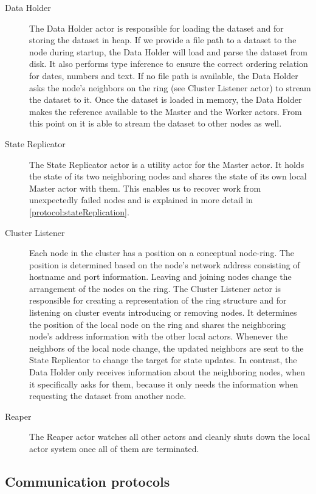 \begin{description}
  \item[Data Holder]
    The Data Holder actor is responsible for loading the dataset and for storing the dataset in heap.
    If we provide a file path to a dataset to the node during startup, the Data Holder will load and parse the dataset from disk.
    It also performs type inference to ensure the correct ordering relation for dates, numbers and text.
    If no file path is available, the Data Holder asks the node's neighbors on the ring (see Cluster Listener actor) to stream the dataset to it.
    Once the dataset is loaded in memory, the Data Holder makes the reference available to the Master and the Worker actors.
    From this point on it is able to stream the dataset to other nodes as well.

  \item[State Replicator]
    The State Replicator actor is a utility actor for the Master actor.
    It holds the state of its two neighboring nodes and shares the state of its own local Master actor with them.
    This enables us to recover work from unexpectedly failed nodes and is explained in more detail in  \cref{protocol:stateReplication}.

  \item[Cluster Listener]
    Each node in the \dodo{} cluster has a position on a conceptual node-ring.
    The position is determined based on the node's network address consisting of hostname and port information.
    Leaving and joining nodes change the arrangement of the nodes on the ring.
    The Cluster Listener actor is responsible for creating a representation of the ring structure and for listening on cluster events introducing or removing nodes.
    It determines the position of the local node on the ring and shares the neighboring node's address information with the other local actors.
    Whenever the neighbors of the local node change, the updated neighbors are sent to the State Replicator to change the target for state updates.
    In contrast, the Data Holder only receives information about the neighboring nodes, when it specifically asks for them, because it only needs the information when requesting the dataset from another node.

  \item[Reaper]
    The Reaper actor watches all other actors and cleanly shuts down the local actor system once all of them are terminated.
  \end{description}

\subsection{Communication protocols}\label{sec:protocols}

